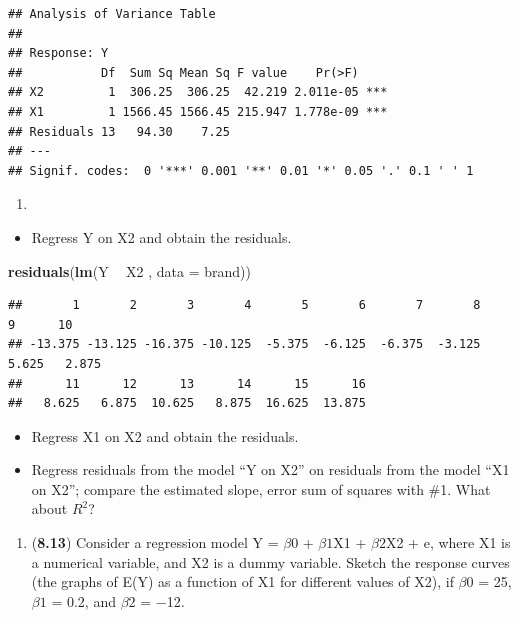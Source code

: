 \documentclass[
]{article}
\newenvironment{Shaded}{\begin{snugshade}}{\end{snugshade}}
\newcommand{\DataTypeTok}[1]{\textcolor[rgb]{0.13,0.29,0.53}{#1}}
\newcommand{\KeywordTok}[1]{\textcolor[rgb]{0.13,0.29,0.53}{\textbf{#1}}}
\newcommand{\NormalTok}[1]{#1}
\newcommand{\OperatorTok}[1]{\textcolor[rgb]{0.81,0.36,0.00}{\textbf{#1}}}
\newcommand{\StringTok}[1]{\textcolor[rgb]{0.31,0.60,0.02}{#1}}
\providecommand{\tightlist}{%
  \setlength{\itemsep}{0pt}\setlength{\parskip}{0pt}}
\begin{document}
\begin{verbatim}
## Analysis of Variance Table
## 
## Response: Y
##           Df  Sum Sq Mean Sq F value    Pr(>F)    
## X2         1  306.25  306.25  42.219 2.011e-05 ***
## X1         1 1566.45 1566.45 215.947 1.778e-09 ***
## Residuals 13   94.30    7.25                      
## ---
## Signif. codes:  0 '***' 0.001 '**' 0.01 '*' 0.05 '.' 0.1 ' ' 1
\end{verbatim}

\begin{enumerate}
\def\labelenumi{(\alph{enumi})}
\setcounter{enumi}{5}
\item
\end{enumerate}

\begin{itemize}
\tightlist
\item
  Regress Y on X2 and obtain the residuals.
\end{itemize}

\begin{Shaded}
\begin{Highlighting}[]
\KeywordTok{residuals}\NormalTok{(}\KeywordTok{lm}\NormalTok{(Y }\OperatorTok{~}\StringTok{ }\NormalTok{X2 , }\DataTypeTok{data =}\NormalTok{ brand))}
\end{Highlighting}
\end{Shaded}

\begin{verbatim}
##       1       2       3       4       5       6       7       8       9      10 
## -13.375 -13.125 -16.375 -10.125  -5.375  -6.125  -6.375  -3.125   5.625   2.875 
##      11      12      13      14      15      16 
##   8.625   6.875  10.625   8.875  16.625  13.875
\end{verbatim}

\begin{itemize}
\tightlist
\item
  Regress X1 on X2 and obtain the residuals.
\item
  Regress residuals from the model ``Y on X2'' on residuals from the
  model ``X1 on X2''; compare the estimated slope, error sum of squares
  with \#1. What about \(R^2\)?
\end{itemize}

\begin{enumerate}
\def\labelenumi{\arabic{enumi}.}
\setcounter{enumi}{5}
\tightlist
\item
  (\textbf{8.13}) Consider a regression model Y = \(\beta0\) +
  \(\beta1\)X1 + \(\beta2\)X2 + e, where X1 is a numerical variable, and
  X2 is a dummy variable. Sketch the response curves (the graphs of E(Y)
  as a function of X1 for different values of X2), if \(\beta0\) = 25,
  \(\beta1\) = 0.2, and \(\beta2\) = −12.
\end{enumerate}
\end{document}

